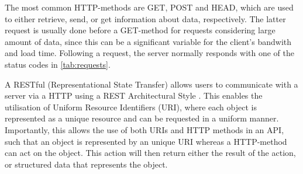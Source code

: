 \begin{table}[!ht]
\centering
\caption{Numeric status code for response. The leftmost digit decide the type of response, while the two follow-up digits depends on the implemented API.}
\label{tab:requests}
\noindent{}
\end{table}

The most common HTTP-methods are GET, POST and HEAD, which are used to either retrieve, send, or get information about data, respectively. The latter request is usually done before a GET-method for requests considering large amount of data, since this can be a significant variable for the client's bandwith and load time. Following a request, the server normally responds with one of the status codes in \autoref{tab:requests}.



A RESTful (Representational State Transfer) allows users to communicate with a server via a HTTP using a REST Architectural Style \cite{Battle2008}. This enables the utilisation of Uniform Resource Identifiers (URI), where each object is represented as a unique resource and can be requested in a uniform manner. Importantly, this allows the use of both URIs and HTTP methods in an API, such that an object is represented by an unique URI whereas a HTTP-method can act on the object. This action will then return either the result of the action, or structured data that represents the object.



